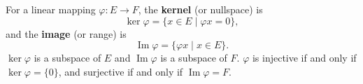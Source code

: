 For a linear mapping $\varphi: E \to F$, the \textbf{kernel} (or nullspace) is
$$\ker \varphi = \{x \in E \mid \varphi x = 0\},$$
and the \textbf{image} (or range) is
$$\operatorname{Im} \varphi = \{\varphi x \mid x \in E\}.$$
$\ker \varphi$ is a subspace of $E$ and $\operatorname{Im} \varphi$ is a subspace of $F$. $\varphi$ is injective if and only if $\ker \varphi = \{0\}$, and surjective if and only if $\operatorname{Im} \varphi = F$.
